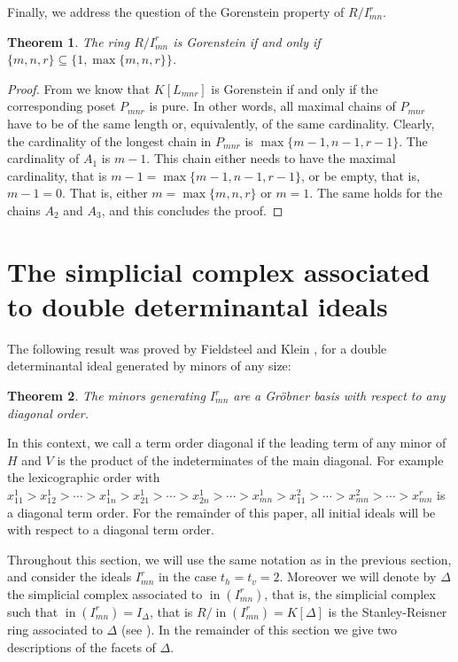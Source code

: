 \documentclass[12pt]{amsart}
\numberwithin{equation}{section}
\newtheorem{theorem}{Theorem}[section]
\theoremstyle{definition}
\DeclareMathOperator{\ini}{in}
\begin{document}
\smallskip

Finally, we address the question of the Gorenstein property of $R/I_{mn}^r$.
\begin{theorem}
\label{thm: Gorenstein}
 The ring $R/I_{mn}^r$ is Gorenstein if and only if $\{m,n,r\}\subseteq \{1,\max\{m,n,r\}\}$.
 \end{theorem}
 \begin{proof}
  From \cite{Hi} we know that $K[L_{mnr}]$ is Gorenstein if and only if the corresponding poset $P_{mnr}$ is pure. In other words, all maximal chains of $P_{mnr}$ have to be of the same length or, equivalently, of the same cardinality. Clearly, the cardinality of the longest chain in $P_{mnr}$ is $\max\{m-1,n-1,r-1\}$. The cardinality of $A_1$ is $m-1$. This chain either needs to have the maximal cardinality, that is $m-1=\max\{m-1,n-1,r-1\}$, or be empty, that is, $m-1=0$. That is, either $m=\max\{m,n,r\}$ or $m=1$. The same holds for the chains $A_2$ and $A_3$, and this concludes the proof.
 \end{proof}

\section{The simplicial complex associated to double determinantal ideals}
The following result was proved by  Fieldsteel and Klein \cite[Theorem 3.2]{FK}, for a double determinantal ideal generated by minors of any size:
\begin{theorem}
\label{thm:GB}
The minors generating $I_{mn}^r$ are a Gr\"obner basis with respect to any diagonal order.
\end{theorem} 

In this context, we call a term order diagonal if the leading term of any minor of $H$ and $V$ is the product of the indeterminates of the main diagonal. For example the lexicographic order with $x_{11}^{1}>x_{12}^{1}>\cdots>x_{1n}^{1}>x_{21}^{1}>\cdots>x_{2n}^{1}>\cdots >x_{mn}^{1}>x_{11}^{2}>\cdots >x_{mn}^{2}>\cdots >x_{mn}^{r}$ is a diagonal term order.  For the remainder of this paper, all initial ideals will be with respect to a diagonal term order.

Throughout this section, we will use the same notation as in the previous section, and consider the ideals $I_{mn}^r$ in the case $t_h=t_v=2$.  Moreover we will denote by $\Delta$ the simplicial complex associated to $\ini(I_{mn}^r)$, that is, the simplicial complex such that $\ini(I_{mn}^r)=I_{\Delta}$, that is $R/\ini(I_{mn}^r)=K[\Delta]$ is the Stanley-Reisner ring associated to $\Delta$ (see \cite[Section 1.5]{HH}).  In the remainder of this section we give two descriptions of the facets of $\Delta$.
\end{document}
